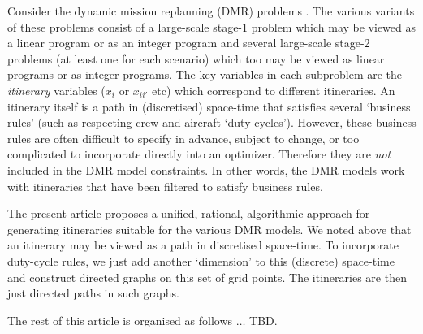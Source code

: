 Consider the dynamic mission replanning (DMR) problems \cite{dmr-planning,dmr-execution}. The various variants of these problems consist of a large-scale stage-1 problem which may be viewed as a linear program or as an integer program and several large-scale stage-2 problems (at least one for each scenario) which too may be viewed as linear programs or as integer programs. The key variables in each subproblem are the \textit{itinerary} variables ($x_i$ or $x_{ii'}$ etc) which correspond to different itineraries. An itinerary itself is a path in (discretised) space-time that satisfies several `business rules' (such as respecting crew and aircraft `duty-cycles'). However, these business rules are often difficult to specify in advance, subject to change, or too complicated to incorporate directly into an optimizer. Therefore they are \textit{not} included in the DMR model constraints. In other words, the DMR models work with itineraries that have been filtered to satisfy business rules.

The present article proposes a unified, rational, algorithmic approach for generating itineraries suitable for the various DMR models. We noted above that an itinerary may be viewed as a path in discretised space-time. To incorporate duty-cycle rules, we just add another `dimension' to this (discrete) space-time and construct directed graphs on this set of grid points. The itineraries are then just directed paths in such graphs.

The rest of this article is organised as follows $\dots$ TBD.